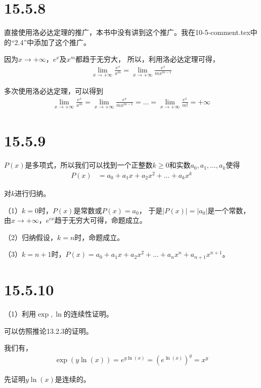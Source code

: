 \documentclass{article}
\begin{document}
\section*{15.5.8}

直接使用洛必达定理的推广，本书中没有讲到这个推广。我在10-5-comment.tex中的“2.4”中添加了这个推广。

因为$x \to +\infty$，$e^x$及$x^m$都趋于无穷大，
所以，利用洛必达定理可得，
\begin{align*}
  \lim\limits_{x \to +\infty} \frac{e^x}{x^m}
  =
  \lim\limits_{x \to +\infty} \frac{e^x}{mx^{m - 1}}
\end{align*}

多次使用洛必达定理，可以得到
\begin{align*}
  \lim\limits_{x \to +\infty} \frac{e^x}{x^m}
  =
  \lim\limits_{x \to +\infty} \frac{e^x}{mx^{m - 1}}
  =
  ...
  =
  \lim\limits_{x \to +\infty} \frac{e^x}{m!}
  = +\infty
\end{align*}

\section*{15.5.9}


$P(x)$是多项式，所以我们可以找到一个正整数$k \geq 0$和实数$a_0, a_1, \dots, a_k$使得
\begin{align*}
  P(x) & = a_0 + a_1x + a_2x^2 + \dots + a_kx^k
\end{align*}

对$k$进行归纳。

（1）$k = 0$时，$P(x)$是常数或$P(x) = a_0$，
于是$|P(x)| = |a_0|$是一个常数，
由$x \to +\infty$，$e^{cx}$趋于无穷大可得，命题成立。

（2）归纳假设，$k = n$时，命题成立。

（3）$k = n + 1$时，$P(x) = a_0 + a_1x + a_2x^2 + \dots + a_nx^n + a_{n + 1}x^{n + 1}$。

\section*{15.5.10}

（1）利用$\exp, \ln$的连续性证明。

可以仿照推论13.2.3的证明。

我们有，
\begin{align*}
  \exp(y\ln(x)) = e^{y\ln(x)} = (e^{\ln(x)})^y = x^y
\end{align*}

先证明$y\ln(x)$是连续的。
\end{document}
